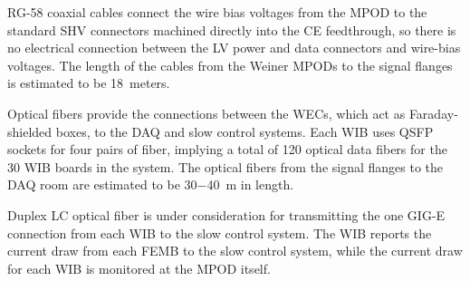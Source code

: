 RG-58 coaxial cables connect the wire bias voltages from the MPOD to the standard SHV
connectors machined directly into the CE feedthrough, so there is no electrical connection between 
the LV power and data connectors and wire-bias voltages. The length of the cables from the Weiner MPODs
to the signal flanges is estimated to be 18~meters.


Optical fibers provide the connections between the WECs, which act as
Faraday-shielded boxes, to the DAQ and slow control systems.
Each WIB uses QSFP sockets for 
four pairs of fiber, %
implying a total of 120 optical data fibers for the 30 WIB boards in the system. The optical fibers from
the signal flanges to the DAQ room are estimated to be 30$-$40~m in length.

Duplex LC optical fiber is under consideration for transmitting the one GIG-E connection from each
WIB to the slow control system. The WIB reports the current draw from each FEMB to the slow control system, while the 
current draw for each WIB is monitored at the MPOD itself.

